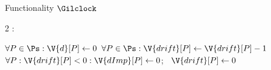 \begin{interface}[nofloat]{Functionality $\Gilclock$ \\
}
{\begin{multicols}{2}
:
\begin{algorithmic}[1]
\algcont
{} \label{ln:clkquorum}
\State $\forall P \in \Ps : \V{d}[P] \gets 0$ \label{ln:clkreset}
\State $\forall P \in \Ps : \V{drift}[P] \gets \V{drift}[P] - 1$ \label{ln:clkrepay}
\State $\forall P : \V{drift}[P] < 0 : \V{dImp}[P] \gets 0$; \ $\V{drift}[P] \gets 0$ \label{ln:clkcatch}
\algsave
\end{algorithmic}
\end{multicols}}
\end{interface}
